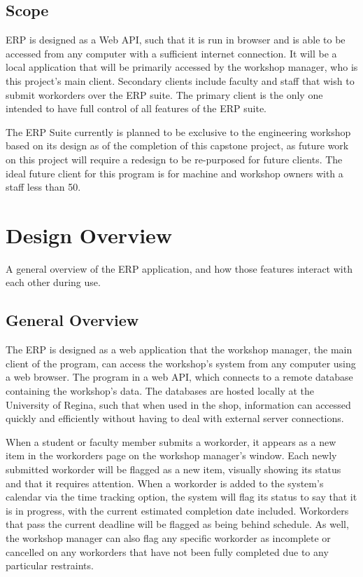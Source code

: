 {\subsection{Scope}
ERP is designed as a Web API, such that it is run in browser and is able to be accessed from any computer with a sufficient internet connection. It will be a local application that will be primarily accessed by the workshop manager, who is this project's main client. Secondary clients include faculty and staff that wish to submit workorders over the ERP suite. The primary client is the only one intended to have full control of all features of the ERP suite. 
\newline
{\setlength{\parindent}{0cm}

The ERP Suite currently is planned to be exclusive to the engineering workshop based on its design as of the completion of this capstone project, as future work on this project will require a redesign to be re-purposed for future clients. The ideal future client for this program is for machine and workshop owners with a staff less than 50.  

\newpage

\section{Design Overview}
A general overview of the ERP application, and how those features interact with each other during use. 

\subsection{General Overview}

The ERP is designed as a web application that the workshop manager, the main client of the program, can access the workshop's system from any computer using a web browser. The program in a web API, which connects to a remote database containing the workshop's data. The databases are hosted locally at the University of Regina, such that when used in the shop, information can accessed quickly and efficiently without having to deal with external server connections. 
\newline
{\setlength{\parindent}{0cm}

When a student or faculty member submits a workorder, it appears as a new item in the workorders page on the workshop manager's window. Each newly submitted workorder will be flagged as a new item, visually showing its status and that it requires attention. When a workorder is added to the system's calendar via the time tracking option, the system will flag its status to say that it is in progress, with the current estimated completion date included. Workorders that pass the current deadline will be flagged as being behind schedule. As well, the workshop manager can also flag any specific workorder as incomplete or cancelled on any workorders that have not been fully completed due to any particular restraints.
\newline
{\setlength{\parindent}{0cm}

}}}}
